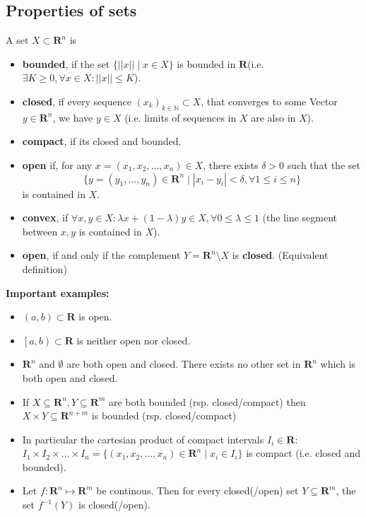 \documentclass[8pt]{extarticle}
\newcommand{\R}{{\mathbb R}}
\newcommand{\X}{{\mathcal X}}
\def\R{\mathbf{R}}
\def\N{\mathbb{N}}
\def\X{X}
\begin{document}
\begin{multicols*}{3}
\subsection{Properties of sets}
A set \(\X \subset \R^n \) is
\begin{itemize}
  \item \textbf{bounded}, if the set \(\{ ||x|| \mid x \in \X \}\) is bounded in \(\R\)(i.e. \(\exists K \ge 0, \forall x \in \X: ||x|| \le K\)).
  \item \textbf{closed}, if every sequence \((x_k)_{k\in \N} \subset \X\), that converges to some Vector \(y \in \R^n\), we have \(y \in \X\) (i.e. limits of sequences in $X$ are also in $X$).
  \item \textbf{compact}, if its closed and bounded.
  \item \textbf{open} if, for any $x =(x_1,x_2,...,x_n) \in \X$, there exists $\delta >0$ such that the set \[\{y = (y_1,...,y_n) \in \R^n \mid |x_i-y_i|< \delta, \forall 1 \leq i \leq n\}\] is contained in $\X$.
  \item \textbf{convex}, if \(\forall x, y \in \X: \lambda x + (1 - \lambda)y \in \X, \forall 0 \leq \lambda \leq 1\) (the line segment between \(x, y\) is contained in \(\X\)).
  \item \textbf{open}, if and only if the complement $Y = \R^n \setminus \X$ is \textbf{closed}. (Equivalent definition)
\end{itemize}
\textbf{Important examples:}
\begin{itemize}
  \item \((a,b) \subset \R\) is open.
  \item \(\left[a,b\right) \subset \R\) is neither open nor closed.
  \item \(\R^n\) and \(\emptyset\) are both open and closed. There exists no other set in $\R^n$ which is both open and closed.
  \item If $X \subseteq \R^n, Y \subseteq \R^m$ are both bounded (rsp. closed/compact) then $X \times Y \subseteq \R^{n+m}$ is bounded (rsp. closed/compact)
  \item In particular the cartesian product of compact intervals $I_i \in \R$: $I_1 \times I_2 \times ... \times I_n = \{(x_1,x_2,...,x_n) \in \R^n \mid x_i \in I_i\}$ is compact (i.e. closed and bounded).
  \item Let $f: \R^n \mapsto \R^m$ be continous. Then for every closed(/open) set $Y \subseteq \R^m$, the set $f^{-1}(Y)$ is closed(/open). 
\end{itemize}


\end{multicols*}
\end{document}
